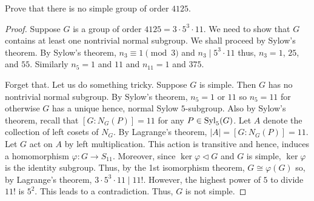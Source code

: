 \begin{problem}
Prove that there is no simple group of order $4125$.
\end{problem}
\begin{proof}
Suppose $G$ is a group of order $4125=3\cdot 5^3\cdot 11$. We need to show
that $G$ contains at least one nontrivial normal subgroup. We shall proceed
by Sylow's theorem. By Sylow's theorem, $n_3\equiv 1\pmod{3}$ and $n_3\mid
5^3\cdot 11$ thus, $n_3=1$, $25$, and $55$. Similarly $n_5=1$ and $11$ and
$n_{11}=1$ and $375$.

Forget that. Let us do something tricky. Suppose $G$ is simple. Then $G$
has no nontrivial normal subgroup. By Sylow's theorem, $n_5=1$ or $11$ so
$n_5=11$ for otherwise $G$ has a unique hence, normal Sylow
$5$-subgroup. Also by Sylow's theorem, recall that
$\left[G:N_G(P)\right]=11$ for any $P\in\operatorname{Syl}_5(G)$. Let $A$ denote the
collection of left cosets of $N_G$. By Lagrange's theorem,
$|A|=\left[G:N_G(P)\right]=11$. Let $G$ act on $A$ by left
multiplication. This action is transitive and hence, induces a homomorphism
$\varphi\colon G\to S_{11}$. Moreover, since $\ker\varphi\lhd G$ and $G$ is
simple, $\ker\varphi$ is the identity subgroup. Thus, by the 1st
isomorphism theorem, $G\cong\varphi(G)$ so, by Lagrange's theorem,
$3\cdot 5^3\cdot 11\mid 11!$. However, the highest power of $5$ to divide
$11!$ is $5^2$. This leads to a contradiction. Thus, $G$ is not simple.
\end{proof}

